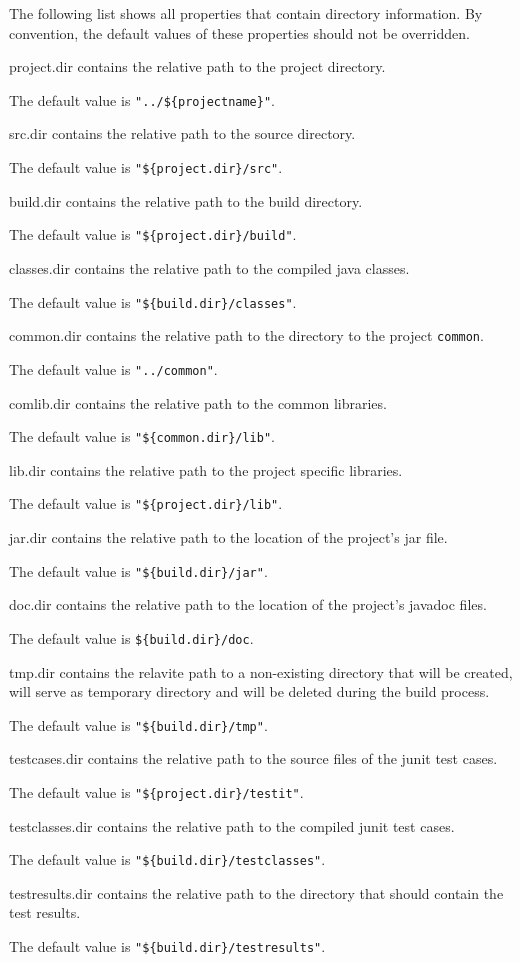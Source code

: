 \documentclass[a4paper,twoside,11pt,bibtotoc]{article}
\begin{document}
The following list shows all properties that contain directory information.
By convention, the default values of these properties should not be overridden.
\begin{description*}
	\item[project.dir] contains the relative path to the project directory.\par The default value is \texttt{"../\$\{projectname\}"}.
	\item[src.dir] contains the relative path to the source directory.\par The default value is \texttt{"\$\{project.dir\}/src"}.
	\item[build.dir] contains the relative path to the build directory.\par The default value is \texttt{"\$\{project.dir\}/build"}.
	\item[classes.dir] contains the relative path to the compiled java classes.\par The default value is \texttt{"\$\{build.dir\}/classes"}.
	\item[common.dir] contains the relative path to the directory to the project \texttt{common}.\par The default value is \texttt{"../common"}.
	\item[comlib.dir] contains the relative path to the common libraries.\par The default value is \texttt{"\$\{common.dir\}/lib"}.
	\item[lib.dir] contains the relative path to the project specific libraries.\par The default value is \texttt{"\$\{project.dir\}/lib"}.
	\item[jar.dir] contains the relative path to the location of the project's jar file.\par The default value is \texttt{"\$\{build.dir\}/jar"}.
	\item[doc.dir] contains the relative path to the location of the project's javadoc files.\par The default value is \texttt{\$\{build.dir\}/doc}.
	\item[tmp.dir] contains the relavite path to a non-existing directory that will be created, will serve as temporary directory and will be deleted during the build process.\par The default value is \texttt{"\$\{build.dir\}/tmp"}.
	\item[testcases.dir] contains the relative path to the source files of the junit test cases.\par The default value is \texttt{"\$\{project.dir\}/testit"}.
	\item[testclasses.dir] contains the relative path to the compiled junit test cases.\par The default value is \texttt{"\$\{build.dir\}/testclasses"}.
	\item[testresults.dir] contains the relative path to the directory that should contain the test results.\par The default value is \texttt{"\$\{build.dir\}/testresults"}.
\end{description*}
\end{document}
